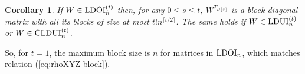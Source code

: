 \documentclass[11pt]{article}
\newcommand{\N}{\ensuremath{\mathbb{N}}}   %
\newcommand{\CLDUI}{\text{\rm CLDUI}}
\newcommand{\LDUI}{\text{\rm LDUI}}
\newcommand{\LDOI}{\text{\rm LDOI}}
\newcommand{\DPS}{\text{\rm DPS}}
\theoremstyle{plain}
\newtheorem{corollary}[satz]{Corollary}
\newcommand{\ML}{\textcolor{blue}}
\begin{document}
\begin{corollary}\label{cor:sizeclique}
If  $W\in \LDOI^{(t)}_n$ then, for any  $0\le s\le t$, $W^{T_{B[s]}}$ is a block-diagonal matrix with all its blocks of size at most $t! n^{\lceil t/2\rceil}$.
The same holds if $W\in \LDUI^{(t)}_n$ or $W\in \CLDUI^{(t)}_n$.
\end{corollary}

So, for $t=1$,  the maximum block size is $n$ for matrices in $\LDOI_n$, which matches  relation (\ref{eq:rhoXYZ-block}). 

\end{document}
